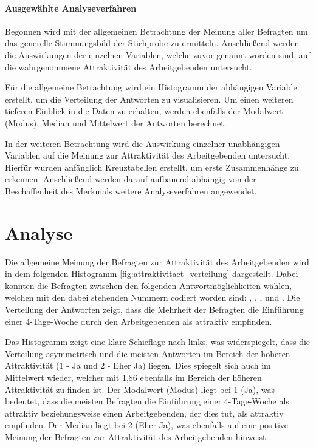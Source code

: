 \paragraph{Ausgewählte Analyseverfahren} Begonnen wird mit der allgemeinen Betrachtung der Meinung 
aller Befragten um das generelle Stimmungsbild der Stichprobe zu ermitteln. Anschließend werden die Auswirkungen
der einzelnen Variablen, welche zuvor genannt worden sind, auf die wahrgenommene Attraktivität des Arbeitgebenden 
untersucht.

Für die allgemeine Betrachtung wird ein Histogramm der abhängigen Variable erstellt, um die Verteilung 
der Antworten zu visualisieren. Um einen weiteren tieferen Einblick in die Daten zu erhalten, werden 
ebenfalls der Modalwert (Modus), Median und Mittelwert der Antworten berechnet.

In der weiteren Betrachtung wird die Auswirkung einzelner unabhängigen Variablen auf die Meinung zur 
Attraktivität des Arbeitgebenden untersucht. Hierfür wurden anfänglich Kreuztabellen erstellt, um erste
Zusammenhänge zu erkennen. 
Anschließend werden darauf aufbauend abhängig von der Beschaffenheit des Merkmals
weitere Analyseverfahren angewendet. %

\section{Analyse}

Die allgemeine Meinung der Befragten zur Attraktivität des Arbeitgebenden wird in dem folgenden Histogramm 
\ref{fig:attraktivitaet_verteilung} dargestellt. Dabei konnten die Befragten zwischen den folgenden Antwortmöglichkeiten wählen,
welchen mit den dabei stehenden Nummern codiert worden sind: , ,
,  und . Die Verteilung der Antworten zeigt, dass die Mehrheit der
Befragten die Einführung einer 4-Tage-Woche durch den Arbeitgebenden als attraktiv empfinden.

Das Histogramm zeigt eine klare Schieflage nach links, was widerspiegelt, dass die Verteilung 
asymmetrisch und die meisten Antworten im Bereich der höheren Attraktivität (1 - Ja und 2 - Eher Ja) liegen. 
Dies spiegelt sich auch im Mittelwert wieder, welcher mit 1,86 ebenfalls im Bereich der höheren Attraktivität
zu finden ist. Der Modalwert (Modus) liegt bei 1 (Ja), was bedeutet, dass die meisten Befragten die Einführung einer 
4-Tage-Woche als attraktiv beziehungsweise einen Arbeitgebenden, der dies tut, als attraktiv empfinden. Der Median
liegt bei 2 (Eher Ja), was ebenfalls auf eine positive Meinung der Befragten zur Attraktivität des Arbeitgebenden
hinweist.


